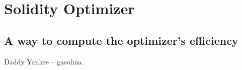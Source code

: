 \chapter*{Solidity Optimizer} 


\section*{A way to compute the optimizer's efficiency}
Daddy Yankee – gasolina.